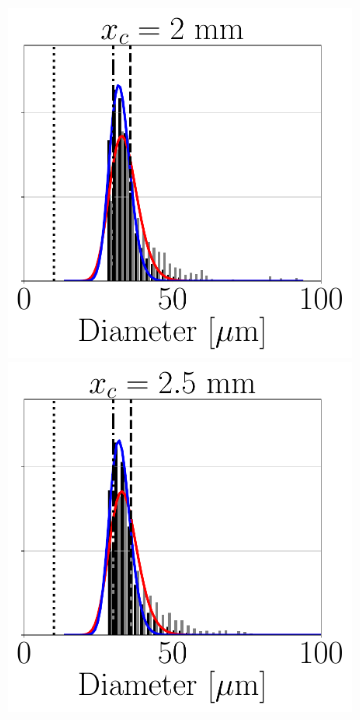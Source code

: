 \begin{figure}[ht]
\begin{subfigure}[b]{1.1\textwidth}
   \includegraphics[scale=0.28]{./part3_applications/figures_ch8_resolved/SPRAY_characterization/histograms_size_volume/DX10_xD06p67_histograms}
   \hspace*{-0.15in}
   \includegraphics[scale=0.28]{./part3_applications/figures_ch8_resolved/SPRAY_characterization/histograms_size_volume/DX10_xD08p33_histograms}

\end{subfigure}
\end{figure}
